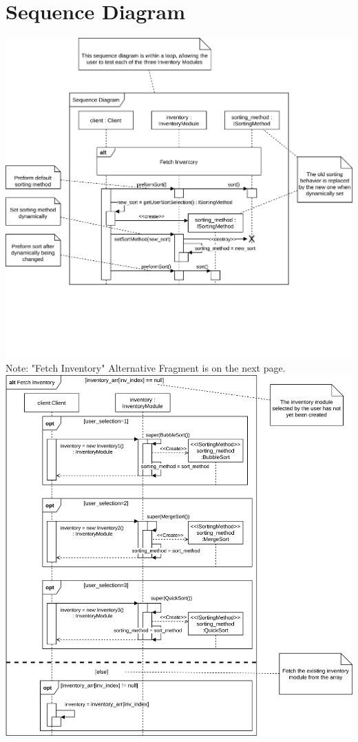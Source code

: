 \documentclass[12pt]{article}
\begin{document}
\newpage
\section*{Sequence Diagram}
\includegraphics[width=\linewidth]{Sequence-Diagram-1.png}
Note: "Fetch Inventory" Alternative Fragment is on the next page.
\newpage
\includegraphics[width=\linewidth]{Sequence-Diagram-2.png}
\end{document}
